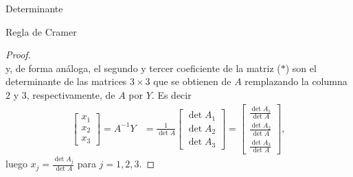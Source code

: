 \begin{chapter}{Determinante}
\begin{section}{Regla de Cramer}
\begin{proof}
$$      $$
      y,  de forma análoga, el segundo y tercer coeficiente de la matriz ($*$) son el determinante de las matrices $3 \times 3$ que se obtienen de $A$ remplazando la columna $2$ y $3$, respectivamente, de
      $A$ por $Y$. Es decir
      \begin{align*}
          \begin{bmatrix} x_1 \\
              x_2 \\
              x_3\end{bmatrix} = A^{-1}Y & = \frac{1}{\det A}\begin{bmatrix} \det A_1 \\
                                                             \det A_2 \\
                                                             \det A_3\end{bmatrix} = \begin{bmatrix} \frac{\det A_1}{\det A} \\
                                                                                     \frac{\det A_2}{\det A} \\
                                                                                     \frac{\det A_3}{\det A}\end{bmatrix},
      \end{align*}
      luego $x_j = \displaystyle\frac{\det A_j}{\det A}$ para $j =1,2,3$.
  \end{proof}


\end{section}
\end{chapter}
